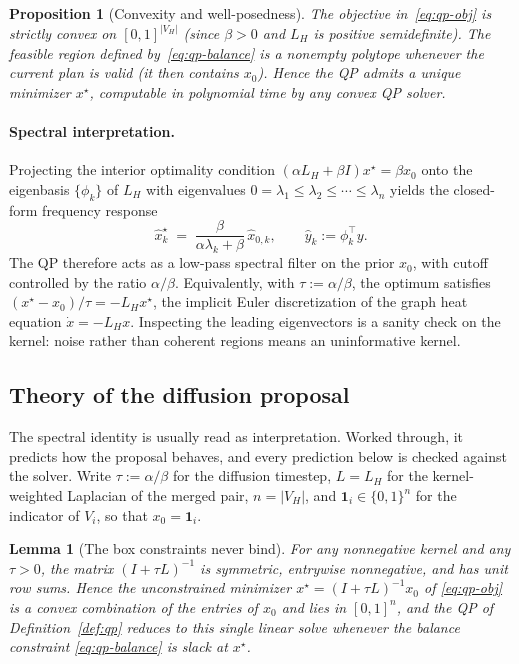 \documentclass[11pt]{article}
\newtheorem{lemma}{Lemma}[section]
\newtheorem{proposition}{Proposition}[section]
\begin{document}
\begin{proposition}[Convexity and well-posedness]\label{prop:convex}
The objective in~\eqref{eq:qp-obj} is strictly convex on
$[0,1]^{|V_H|}$ (since $\beta > 0$ and $L_H$ is positive semidefinite).
The feasible region defined by~\eqref{eq:qp-balance} is a nonempty
polytope whenever the current plan is valid (it then contains $x_0$).
Hence the QP admits a unique minimizer $x^\star$, computable in
polynomial time by any convex QP solver.
\end{proposition}

\paragraph{Spectral interpretation.} Projecting the interior optimality
condition $(\alpha L_H + \beta I) x^\star = \beta x_0$ onto the
eigenbasis $\{\phi_k\}$ of $L_H$ with eigenvalues
$0 = \lambda_1 \le \lambda_2 \le \cdots \le \lambda_n$ yields the
closed-form frequency response
\begin{equation}\label{eq:freq-response}
  \hat x^\star_k \;=\; \frac{\beta}{\alpha \lambda_k + \beta}\,
  \hat x_{0,k},
  \qquad \hat y_k := \phi_k^\top y.
\end{equation}
The QP therefore acts as a low-pass spectral filter on the prior $x_0$,
with cutoff controlled by the ratio $\alpha / \beta$. Equivalently, with
$\tau := \alpha / \beta$, the optimum satisfies
$(x^\star - x_0)/\tau = -L_H x^\star$, the implicit Euler
discretization of the graph heat equation $\dot x = -L_H x$. Inspecting the leading eigenvectors is a sanity check on the kernel:
noise rather than coherent regions means an uninformative kernel.

\subsection{Theory of the diffusion proposal}\label{sec:diffusion-theory}

The spectral identity is usually read as interpretation. Worked
through, it predicts how the proposal behaves, and every prediction
below is checked against the solver. Write $\tau := \alpha/\beta$ for
the diffusion timestep, $L = L_H$ for the kernel-weighted Laplacian of
the merged pair, $n = |V_H|$, and $\mathbf{1}_i \in \{0,1\}^{n}$ for
the indicator of $V_i$, so that $x_0 = \mathbf{1}_i$.

\begin{lemma}[The box constraints never bind]\label{lem:row-stochastic}
For any nonnegative kernel and any $\tau > 0$, the matrix
$(I + \tau L)^{-1}$ is symmetric, entrywise nonnegative, and has unit
row sums. Hence the unconstrained minimizer
$x^\star = (I + \tau L)^{-1} x_0$ of \eqref{eq:qp-obj} is a convex
combination of the entries of $x_0$ and lies in $[0,1]^{n}$, and the
QP of Definition~\ref{def:qp} reduces to this single linear solve
whenever the balance constraint \eqref{eq:qp-balance} is slack at
$x^\star$.
\end{lemma}
\end{document}
